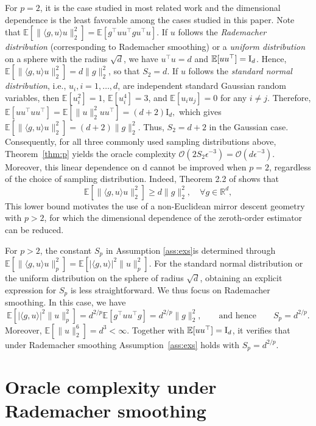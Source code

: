 \documentclass[11pt]{article}
\numberwithin{equation}{section}
\newcommand{\R}{\mathbb{R}}
\newcommand{\E}{\mathbb{E}}
\begin{document}
For \( p = 2 \), it is the case studied in most related work and the dimensional dependence is the least favorable among the cases studied in this paper. Note that 
$
    \E [\|\langle g,u\rangle u\|_2^2] = \E [g^\top uu^\top g u^\top u].
$ 
If  $u$ follows the {\it Rademacher distribution}  (corresponding to  Rademacher smoothing) or a {\it uniform distribution} on a sphere with the radius $\sqrt{d}$, we have $u^\top u = d$ and $\E [uu^\top] = {\rm I}_d$. Hence, $\E [\|\langle g,u\rangle u\|_2^2] = d \|g\|_2^2$, so that $S_2 = d$. If $u$ follows the {\it standard normal distribution}, i.e., $u_i, i=1,\ldots,d$, are independent standard Gaussian random variables, then $\E[u_i^2]=1$, $\E[u_i^4]=3$, and $\E[u_i u_j]=0$ for any $i \neq j$. Therefore,
\(
 \E[uu^\top uu^\top]=\E[\|u\|_2^2uu^\top]=(d+2)\mathrm I_d,
\) 
which gives $\E [\|\langle g,u\rangle u\|_2^2] = (d+2) \|g\|_2^2$. Thus, $S_2 = d+2$ in the Gaussian case. Consequently, for all three commonly used sampling distributions above, Theorem~\ref{thm:p} yields the oracle complexity  $\mathcal{O}(2S_2 \epsilon^{-3}) = \mathcal{O}(d \epsilon^{-3})$. Moreover, this linear dependence on d cannot be improved when \(p=2\), regardless of the choice of sampling distribution. Indeed, Theorem 2.2 of \cite{ma2025revisiting} shows that
\[
\mathbb{E}[\|\langle g, u \rangle u\|_2^2] \geq d\|g\|_2^2, \quad \forall g\in\R^d,
\]
This lower bound motivates the use of a non-Euclidean mirror descent geometry with \(p>2\), for which the dimensional dependence of the zeroth-order estimator can be reduced.  

For \( p > 2 \), the constant  \( S_p \) in Assumption \ref{ass:exs}is determined through \( \mathbb{E}[\|\langle g, u \rangle u\|_p^2] = \mathbb{E}[|\langle g, u \rangle|^2 \|u\|_p^2] \). For the standard normal distribution or the uniform distribution on the sphere of radius \( \sqrt{d} \), obtaining an explicit expression for \(S_p\)  is less straightforward. We thus focus on Rademacher smoothing. In this case, we have 
\begin{equation}\label{eq:Sp-rad}
\mathbb{E}[|\langle g, u \rangle|^2 \|u\|_p^2] = d^{2/p} \mathbb{E}[g^\top u u^\top g] = d^{2/p} \|g\|_2^2,
\qquad\text{and hence}\qquad S_p=d^{2/p}.
\end{equation}
Moreover, 
\(\E[\|u\|_2^6]=d^3<\infty.\)
Together with $\E[uu^\top]={\rm I}_d$, it verifies that under  Rademacher
smoothing Assumption~\ref{ass:exs} holds with
$S_p=d^{2/p}$.

\section{Oracle complexity under Rademacher smoothing}\label{sec:compl}
\end{document}
